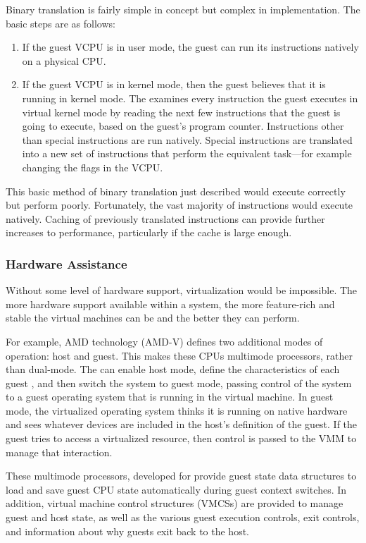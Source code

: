 Binary translation is fairly simple in concept but complex in implementation.
The basic steps are as follows:
\begin{enumerate}[noitemsep]
\item If the guest VCPU is in user mode, the guest can run its instructions natively on a physical CPU.\@
\item If the guest VCPU is in kernel mode, then the guest believes that it is running in kernel mode.
  The  examines every instruction the guest executes in virtual kernel mode by reading the next few instructions that the guest is going to execute, based on the guest's program counter.
  Instructions other than special instructions are run natively.
  Special instructions are translated into a new set of instructions that perform the equivalent task—for example changing the flags in the VCPU.\@
\end{enumerate}

This basic method of binary translation just described would execute correctly but perform poorly.
Fortunately, the vast majority of instructions would execute natively.
Caching of previously translated instructions can provide further increases to performance, particularly if the cache is large enough.

\subsubsection{Hardware Assistance}\label{subsubsec:VM_Hardware_Assistance}
Without some level of hardware support, virtualization would be impossible.
The more hardware support available within a system, the more feature-rich and stable the virtual machines can be and the better they can perform.

For example, AMD  technology (AMD-V) defines two additional modes of operation: host and guest.
This makes these CPUs multimode processors, rather than dual-mode.
The  can enable host mode, define the characteristics of each guest , and then switch the system to guest mode, passing control of the system to a guest operating system that is running in the virtual machine.
In guest mode, the virtualized operating system thinks it is running on native hardware and sees whatever devices are included in the host's definition of the guest.
If the guest tries to access a virtualized resource, then control is passed to the VMM to manage that interaction.

These multimode processors, developed for  provide guest  state data structures to load and save guest CPU state automatically during guest context switches.
In addition, virtual machine control structures (VMCSs) are provided to manage guest and host state, as well as the various guest execution controls, exit controls, and information about why guests exit back to the host.



